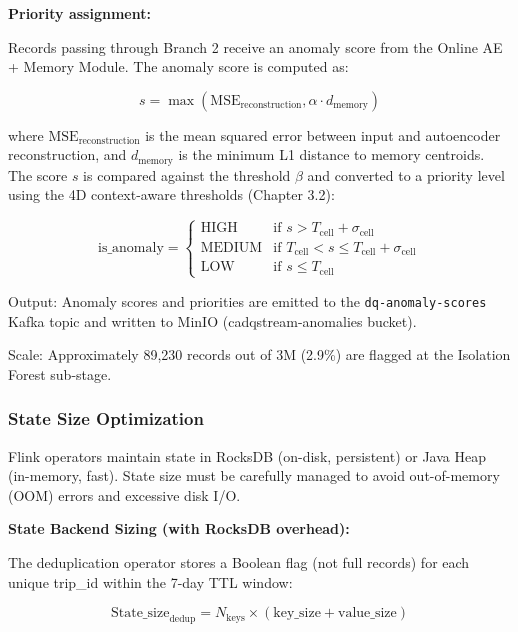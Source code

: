 \textbf{Priority assignment:}

Records passing through Branch 2 receive an anomaly score from the Online AE + Memory Module. The anomaly score is computed as:

\begin{equation}
s = \max\left(\text{MSE}_{\text{reconstruction}}, \alpha \cdot d_{\text{memory}}\right)
\end{equation}

where $\text{MSE}_{\text{reconstruction}}$ is the mean squared error between input and autoencoder reconstruction, and $d_{\text{memory}}$ is the minimum L1 distance to memory centroids. The score $s$ is compared against the threshold $\beta$ and converted to a priority level using the 4D context-aware thresholds (Chapter 3.2):

\begin{equation}
\text{is\_anomaly} = \begin{cases}
\text{HIGH} & \text{if } s > T_{\text{cell}} + \sigma_{\text{cell}} \\
\text{MEDIUM} & \text{if } T_{\text{cell}} < s \leq T_{\text{cell}} + \sigma_{\text{cell}} \\
\text{LOW} & \text{if } s \leq T_{\text{cell}}
\end{cases}
\end{equation}

Output: Anomaly scores and priorities are emitted to the \texttt{dq-anomaly-scores} Kafka topic and written to MinIO (cadqstream-anomalies bucket).

Scale: Approximately 89,230 records out of 3M (2.9\%) are flagged at the Isolation Forest sub-stage.

\subsubsection{State Size Optimization}

Flink operators maintain state in RocksDB (on-disk, persistent) or Java Heap (in-memory, fast). State size must be carefully managed to avoid out-of-memory (OOM) errors and excessive disk I/O.

\textbf{State Backend Sizing (with RocksDB overhead):}

The deduplication operator stores a Boolean flag (not full records) for each unique trip\_id within the 7-day TTL window:

\begin{equation}
\text{State\_size}_{\text{dedup}} = N_{\text{keys}} \times (\text{key\_size} + \text{value\_size})
\end{equation}


